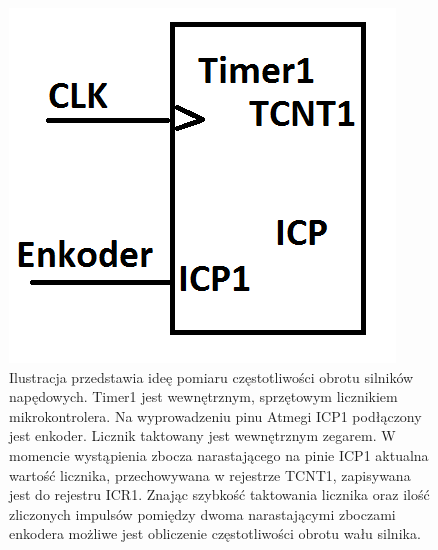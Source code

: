   \begin{figure}[H]
    \begin{center}
      \includegraphics[scale=0.4]{imgs/predkosc.png}
 	\caption[Pomiar częstotliwości obrotu silnika.]{\small{Ilustracja przedstawia ideę pomiaru częstotliwości obrotu silników napędowych. Timer1 jest wewnętrznym, sprzętowym licznikiem mikrokontrolera. Na wyprowadzeniu pinu Atmegi ICP1 podłączony jest enkoder. Licznik taktowany jest wewnętrznym zegarem. W momencie wystąpienia zbocza narastającego na pinie ICP1 aktualna wartość licznika, przechowywana w rejestrze TCNT1, zapisywana jest do rejestru ICR1. Znając szybkość taktowania licznika oraz ilość zliczonych impulsów pomiędzy dwoma narastającymi zboczami enkodera możliwe jest obliczenie częstotliwości obrotu wału silnika.}}
	\label{predkosc}
    \end{center}
  \end{figure}
